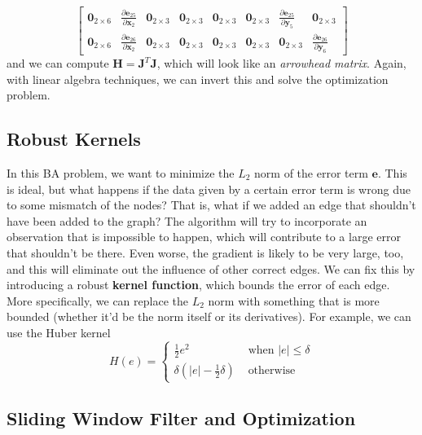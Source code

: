 \documentclass{article}
\newcounter{example}[section]
\newcounter{algo}[section]
\begin{document}
\begin{equation}
\begin{bmatrix}
      \mathbf{0}_{2 \times 6} & \frac{\partial \mathbf{e}_{25}}{\partial \mathbf{x}_2} & \mathbf{0}_{2 \times 3} & \mathbf{0}_{2 \times 3} & \mathbf{0}_{2 \times 3} & \mathbf{0}_{2 \times 3} & \frac{\partial \mathbf{e}_{25}}{\partial \mathbf{y}_5} &  \mathbf{0}_{2 \times 3} \\

      \mathbf{0}_{2 \times 6} & \frac{\partial \mathbf{e}_{26}}{\partial \mathbf{x}_2}  & \mathbf{0}_{2 \times 3} & \mathbf{0}_{2 \times 3} & \mathbf{0}_{2 \times 3} & \mathbf{0}_{2 \times 3} & \mathbf{0}_{2 \times 3} & \frac{\partial \mathbf{e}_{26}}{\partial \mathbf{y}_6}
      \end{bmatrix}
  \end{equation}
  and we can compute $\mathbf{H} = \mathbf{J}^T \mathbf{J}$, which will look like an \textit{arrowhead matrix}. Again, with linear algebra techniques, we can invert this and solve the optimization problem. 

  \subsection{Robust Kernels}

  In this BA problem, we want to minimize the $L_2$ norm of the error term $\mathbf{e}$. This is ideal, but what happens if the data given by a certain error term is wrong due to some mismatch of the nodes? That is, what if we added an edge that shouldn't have been added to the graph? The algorithm will try to incorporate an observation that is impossible to happen, which will contribute to a large error that shouldn't be there. Even worse, the gradient is likely to be very large, too, and this will eliminate out the influence of other correct edges. We can fix this by introducing a robust \textbf{kernel function}, which bounds the error of each edge. More specifically, we can replace the $L_2$ norm with something that is more bounded (whether it'd be the norm itself or its derivatives). For example, we can use the Huber kernel 
  \begin{equation}
    H(e) = \begin{cases} \frac{1}{2} e^2 & \text{ when } |e| \leq \delta \\ \delta (|e| - \frac{1}{2} \delta) & \text{ otherwise } \end{cases}
  \end{equation}

  \subsection{Sliding Window Filter and Optimization}
\end{document}
